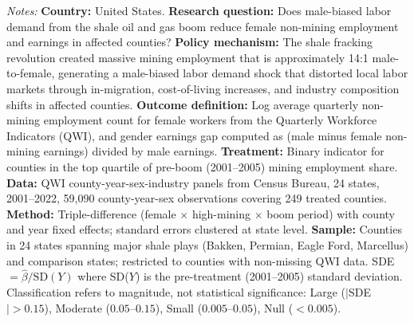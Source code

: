 \begin{table}[htbp]
\begin{minipage}{\textwidth}
\vspace{0.5em}
\footnotesize
\textit{Notes:} \textbf{Country:} United States. \textbf{Research question:} Does male-biased labor demand from the shale oil and gas boom reduce female non-mining employment and earnings in affected counties? \textbf{Policy mechanism:} The shale fracking revolution created massive mining employment that is approximately 14:1 male-to-female, generating a male-biased labor demand shock that distorted local labor markets through in-migration, cost-of-living increases, and industry composition shifts in affected counties. \textbf{Outcome definition:} Log average quarterly non-mining employment count for female workers from the Quarterly Workforce Indicators (QWI), and gender earnings gap computed as (male minus female non-mining earnings) divided by male earnings. \textbf{Treatment:} Binary indicator for counties in the top quartile of pre-boom (2001--2005) mining employment share. \textbf{Data:} QWI county-year-sex-industry panels from Census Bureau, 24 states, 2001--2022, 59,090 county-year-sex observations covering 249 treated counties. \textbf{Method:} Triple-difference (female $\times$ high-mining $\times$ boom period) with county and year fixed effects; standard errors clustered at state level. \textbf{Sample:} Counties in 24 states spanning major shale plays (Bakken, Permian, Eagle Ford, Marcellus) and comparison states; restricted to counties with non-missing QWI data. SDE $= \hat{\beta} / \text{SD}(Y)$ where SD($Y$) is the pre-treatment (2001--2005) standard deviation. Classification refers to magnitude, not statistical significance: Large ($|$SDE$| > 0.15$), Moderate ($0.05$--$0.15$), Small ($0.005$--$0.05$), Null ($< 0.005$).
\end{minipage}
\end{table}
